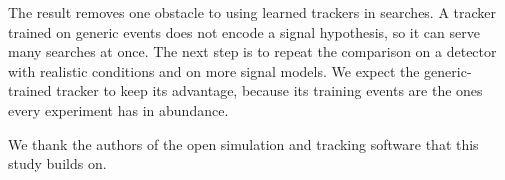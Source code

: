 \documentclass[aps,prd,preprint,superscriptaddress,nofootinbib]{revtex4-2}
\begin{document}
The result removes one obstacle to using learned trackers in searches.
A tracker trained on generic events does not encode a signal hypothesis, so it can serve many searches at once.
The next step is to repeat the comparison on a detector with realistic conditions and on more signal models.
We expect the generic-trained tracker to keep its advantage, because its training events are the ones every experiment has in abundance.

\begin{acknowledgments}
We thank the authors of the open simulation and tracking software that this study builds on.
\end{acknowledgments}

\appendix



\end{document}
